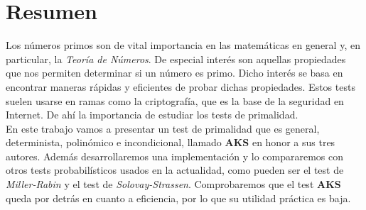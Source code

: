 %

\chapter{Resumen}

Los números primos son de vital importancia en las matemáticas en general y, en particular, la \textit{Teoría de Números}. De especial interés son aquellas propiedades que nos permiten determinar si un número es primo. Dicho interés se basa en encontrar maneras rápidas y eficientes de probar dichas propiedades. Estos tests suelen usarse en ramas como la criptografía, que es la base de la seguridad en Internet. De ahí la importancia de estudiar los tests de primalidad.\\

En este trabajo vamos a presentar un test de primalidad que es general, determinista, polinómico e incondicional, llamado \textbf{AKS} en honor a sus tres autores. Además desarrollaremos una implementación y lo compararemos con otros tests probabilísticos usados en la actualidad, como pueden ser el test de \textit{Miller-Rabin} y el test de \textit{Solovay-Strassen}. Comprobaremos que el test \textbf{AKS} queda por detrás en cuanto a eficiencia, por lo que su utilidad práctica es baja.

\endinput